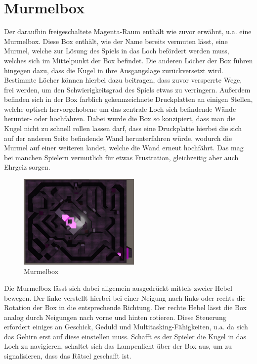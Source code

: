 \section{Murmelbox}
Der daraufhin freigeschaltete Magenta-Raum enthält wie zuvor erwähnt, u.a. eine Murmelbox. Diese Box enthält, wie der Name bereits vermuten lässt, eine Murmel, welche zur Lösung des Spiels in das Loch befördert werden muss, welches sich im Mittelpunkt der Box befindet. Die anderen Löcher der Box führen hingegen dazu, dass die Kugel in ihre Ausgangslage zurückversetzt wird. Bestimmte Löcher können hierbei dazu beitragen, dass zuvor versperrte Wege, frei werden, um den Schwierigkeitsgrad des Spiels etwas zu verringern. Außerdem befinden sich in der Box farblich gekennzeichnete Druckplatten an einigen Stellen, welche optisch hervorgehobene um das zentrale Loch sich befindende Wände herunter- oder hochfahren. Dabei wurde die Box so konzipiert, dass man die Kugel nicht zu schnell rollen lassen darf, dass eine Druckplatte hierbei die sich auf der anderen Seite befindende Wand herunterfahren würde, wodurch die Murmel auf einer weiteren landet, welche die Wand erneut hochfährt. Das mag bei manchen Spielern vermutlich für etwas Frustration, gleichzeitig aber auch Ehrgeiz sorgen.\\
\begin{figure}
	\vspace*{-1cm}
	\includegraphics[width=5.9cm]{Pictures/Murmelbox}
	\caption{Murmelbox}
	\vspace*{-1cm}
	\label{fig:murmelbox}
\end{figure}
Die Murmelbox lässt sich dabei allgemein ausgedrückt mittels zweier Hebel bewegen. Der linke verstellt hierbei bei einer Neigung nach links oder rechts die Rotation der Box in die entsprechende Richtung. Der rechte Hebel lässt die Box analog durch Neigungen nach vorne und hinten rotieren. Diese Steuerung erfordert einiges an Geschick, Geduld und Multitasking-Fähigkeiten, u.a. da sich das Gehirn erst auf diese einstellen muss. Schafft es der Spieler die Kugel in das Loch zu navigieren, schaltet sich das Lampenlicht über der Box aus, um zu signalisieren, dass das Rätsel geschafft ist.
